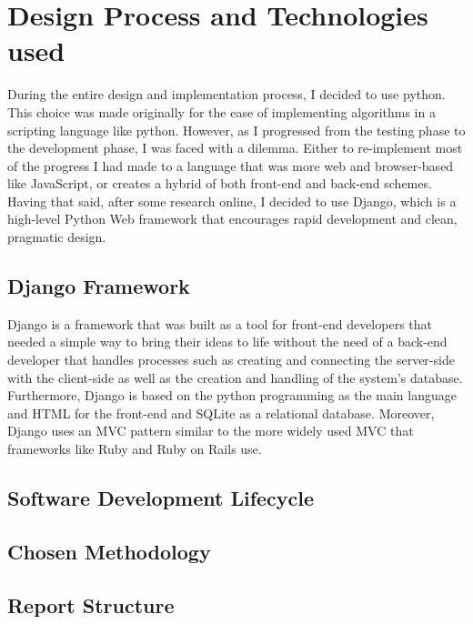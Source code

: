 \section{Design Process and Technologies used}
During the entire design and implementation process, I decided to use python. This choice was made originally for the ease of implementing algorithms in a scripting language like python. However, as I progressed from the testing phase to the development phase, I was faced with a dilemma. Either to re-implement most of the progress I had made to a language that was more web and browser-based like JavaScript, or creates a hybrid of both front-end and back-end schemes. Having that said, after some research online, I decided to use Django, which is a high-level Python Web framework that encourages rapid development and clean, pragmatic design.

\subsection{Django Framework}
Django is a framework that was built as a tool for front-end developers that needed a simple way to bring their ideas to life without the need of a back-end developer that handles processes such as creating and connecting the server-side with the client-side as well as the creation and handling of the system's database. Furthermore, Django is based on the python programming as the main language and HTML for the front-end and SQLite as a relational database. Moreover, Django uses an MVC pattern similar to the more widely used MVC that frameworks like Ruby and Ruby on Rails use.

\subsection{Software Development Lifecycle}

\subsection{Chosen Methodology}

\subsection{Report Structure}
